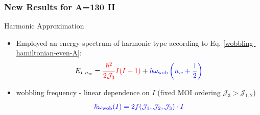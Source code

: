 \documentclass{beamer}
\begin{document}
\begin{frame}
  \frametitle{New Results for A=130 II}
      \begin{alertblock}{Harmonic Approximation}
        \begin{itemize}
          \item Employed an energy spectrum of harmonic type according to Eq. \ref{wobbling-hamiltonian-even-A}:
          \begin{align}
            E_{I,n_w}={\color{red}\frac{\hbar^2}{2\mathcal{J}_3}I(I+1)}+{\color{blue}\hbar\omega_\text{wob}\left(n_w+\frac{1}{2}\right)}
          \end{align}
          \item wobbling frequency - linear dependence on $I$ (fixed MOI ordering $\mathcal{J}_3>\mathcal{J}_{1,2}$)
          \begin{align}
            {\color{blue}\hbar\omega_\text{wob}(I)=2f(\mathcal{J}_1,\mathcal{J}_2,\mathcal{J}_3)\cdot I}
          \end{align}
        \end{itemize}
      \end{alertblock}
\end{frame}
\end{document}
